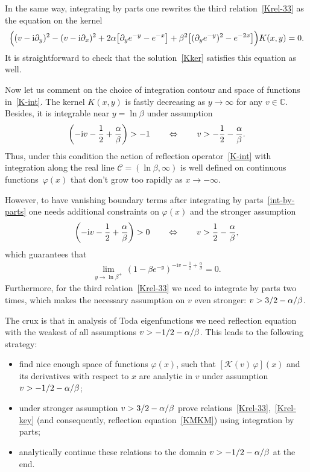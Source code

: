 \documentclass[11pt]{article}
\numberwithin{equation}{section}
\theoremstyle{plain}
\theoremstyle{definition}
\let\Re\relax
\let\Im\relax
\DeclareMathOperator{\Re}{Re}
\DeclareMathOperator{\Im}{Im}
\renewcommand{\phi}{\varphi}
\renewcommand{\imath}{\mathrm{i}}
\begin{document}
In the same way, integrating by parts one rewrites the third relation~\eqref{Krel-33} as the equation on the kernel
\begin{align}
	\Bigl( (v - \imath \partial_y)^2 - (v - \imath \partial_x)^2 + 2\alpha \bigl[ \partial_y e^{-y} - e^{-x} \bigr] + \beta^2 \bigl[ (\partial_y e^{-y})^2 - e^{-2x} \bigr] \Bigr) K(x, y) = 0.
\end{align}
It is straightforward to check that the solution~\eqref{Kker} satisfies this equation as well.

Now let us comment on the choice of integration contour and space of functions in~\eqref{K-int}. The kernel $K(x, y)$ is fastly decreasing as $y \to \infty$ for any $v \in \mathbb{C}$. Besides, it is integrable near $y = \ln \beta$ under assumption
\begin{align}
	\Re \biggl( -\imath v - \frac{1}{2} + \frac{\alpha}{\beta} \biggr) > -1 \qquad \Leftrightarrow \qquad \Im v > - \frac{1}{2} - \frac{\alpha}{\beta} .
\end{align}
Thus, under this condition the action of reflection operator~\eqref{K-int} with integration along the real line $\mathcal{C} = (\ln\beta, \infty)$ is well defined on continuous functions~$\phi(x)$ that don't grow too rapidly as $x \to -\infty$. 

However, to have vanishing boundary terms after integrating by parts~\eqref{int-by-parts} one needs additional constraints on $\phi(x)$ and the stronger assumption
\begin{align}
	\Re \biggl( -\imath v - \frac{1}{2} + \frac{\alpha}{\beta} \biggr) > 0 \qquad \Leftrightarrow \qquad \Im v > \frac{1}{2} - \frac{\alpha}{\beta},
\end{align}
which guarantees that
\begin{align}
	\lim_{y \to \ln\beta^+} \, (1 - \beta e^{-y})^{-\imath v - \frac{1}{2} + \frac{\alpha}{\beta}} = 0.
\end{align}
Furthermore, for the third relation~\eqref{Krel-33} we need to integrate by parts two times, which makes the necessary assumption on $v$ even stronger: $\Im v > 3/2 - \alpha/\beta$. 

The crux is that in analysis of Toda eigenfunctions we need reflection equation with the weakest of all assumptions $\Im v > -1/2 -\alpha/\beta$. This leads to the following strategy:

\begin{itemize}
	\item[(1)] find nice enough space of functions $\phi(x)$, such that $[\mathcal{K}(v) \, \phi](x)$ and its derivatives with respect to $x$ are analytic in $v$ under assumption $\Im v > -1/2 -\alpha/\beta$;
	\item[(2)] under stronger assumption $\Im v > 3/2 -\alpha/\beta$ prove relations~\eqref{Krel-33},~\eqref{Krel-key} (and consequently, reflection equation~\eqref{KMKM}) using integration by parts;
	\item[(3)] analytically continue these relations to the domain $\Im v > -1/2 -\alpha/\beta$ at the end.
\end{itemize}
\end{document}
